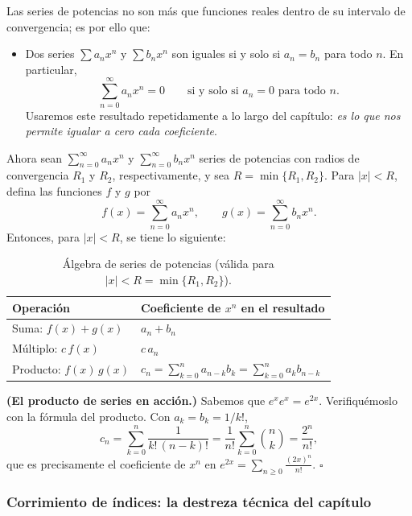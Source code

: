 Las series de potencias no son más que funciones reales dentro de su intervalo de convergencia; es por ello que:
 
\begin{itemize}
\item Dos series $\sum a_n x^n$ y $\sum b_n x^n$ son iguales si y solo si $a_n = b_n$ para todo $n$. En particular,
\[ \sum_{n=0}^{\infty} a_n x^n = 0 \qquad \text{si y solo si } a_n = 0 \text{ para todo } n. \]
Usaremos este resultado repetidamente a lo largo del capítulo: \emph{es lo que nos permite igualar a cero cada coeficiente}.
\end{itemize}
 
Ahora sean $\sum_{n=0}^{\infty} a_n x^n$ y $\sum_{n=0}^{\infty} b_n x^n$ series de potencias con radios de convergencia $R_1$ y $R_2$, respectivamente, y sea $R = \min\{R_1, R_2\}$. Para $|x| < R$, defina las funciones $f$ y $g$ por
\[ f(x) = \sum_{n=0}^{\infty} a_n x^n, \qquad g(x) = \sum_{n=0}^{\infty} b_n x^n. \]
Entonces, para $|x| < R$, se tiene lo siguiente:
 
\begin{table}[H]
\centering
\small
\caption{Álgebra de series de potencias (válida para $|x|<R=\min\{R_1,R_2\}$).}
\label{tab:s1-operaciones}
\begin{tabular}{|l|l|}
\hline
\rowcolor{bbe!15}\textbf{Operación} & \textbf{Coeficiente de $x^n$ en el resultado} \\ \hline
Suma: $f(x)+g(x)$ & $a_n+b_n$ \\ \hline
Múltiplo: $c\,f(x)$ & $c\,a_n$ \\ \hline
Producto: $f(x)\,g(x)$ & $c_n=\displaystyle\sum_{k=0}^{n} a_{n-k}b_k=\sum_{k=0}^{n} a_k b_{n-k}$ \\ \hline
\end{tabular}
\end{table}
 
\begin{example}
\textbf{(El producto de series en acción.)} Sabemos que $e^x e^x=e^{2x}$. Verifiquémoslo con la fórmula del producto. Con $a_k=b_k=1/k!$,
\[ c_n=\sum_{k=0}^{n}\frac{1}{k!\,(n-k)!}=\frac{1}{n!}\sum_{k=0}^{n}\binom{n}{k}=\frac{2^n}{n!}, \]
que es precisamente el coeficiente de $x^n$ en $e^{2x}=\sum_{n\ge 0} \frac{(2x)^n}{n!}$. \hfill $\square$
\end{example}
 
\subsubsection*{Corrimiento de índices: la destreza técnica del capítulo}
 
